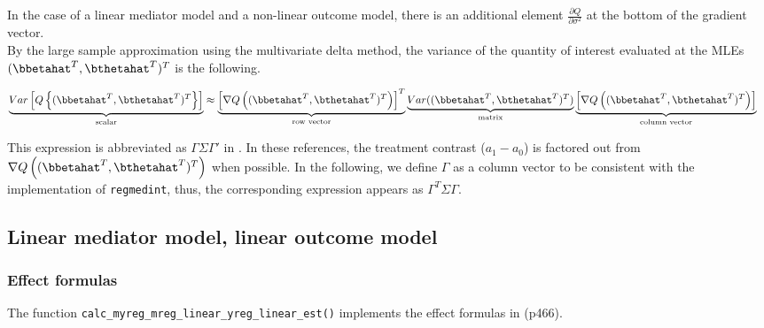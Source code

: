 \documentclass[10pt]{article}
\begin{document}
In the case of a linear mediator model and a non-linear outcome model, there is an additional element \(\frac{\partial Q}{\partial \sigma^{2}}\) at the bottom of the gradient vector.\\

By the large sample approximation using the multivariate delta method, the variance of the quantity of interest evaluated at the MLEs \((\bbetahat^{T},\bthetahat^{T})^{T}\) is the following.

\begin{align*}
  \underbrace{Var \left[ Q\left\{ (\bbetahat^{T},\bthetahat^{T})^{T} \right\} \right]}_{\text{scalar}}
  &\approx
  \underbrace{\left[ \nabla Q \left( (\bbetahat^{T},\bthetahat^{T})^{T} \right) \right]^{T}}_{\text{row vector}}
  \underbrace{Var((\bbetahat^{T},\bthetahat^{T})^{T})}_{\text{matrix}}
  \underbrace{\left[ \nabla Q \left( (\bbetahat^{T},\bthetahat^{T})^{T} \right) \right]}_{\text{column vector}}
\end{align*}

This expression is abbreviated as \(\Gamma\Sigma\Gamma'\) in \cite{vanderweeleExplanationCausalInference2015,valeriMediationAnalysisAllowing2013,valeriSASMacroCausal2015}. In these references, the treatment contrast (\(a_{1}-a_{0}\)) is factored out from \(\nabla Q \left( (\bbetahat^{T},\bthetahat^{T})^{T} \right)\) when possible. In the following, we define \(\Gamma\) as a column vector to be consistent with the implementation of \texttt{regmedint}, thus, the corresponding expression appears as \(\Gamma^{T}\Sigma\Gamma\).

\subsection{Linear mediator model, linear outcome model}
\label{sec:org03fbd56}
\subsubsection{Effect formulas}
\label{sec:orgf34a8de}
The function \texttt{calc\_myreg\_mreg\_linear\_yreg\_linear\_est()} implements the effect formulas in \cite{vanderweeleExplanationCausalInference2015} (p466).
\end{document}
